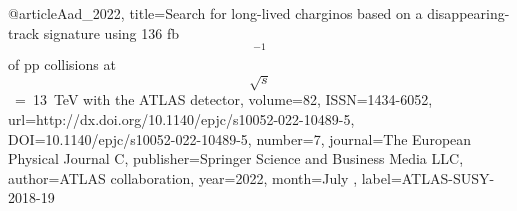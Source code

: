 @article{Aad_2022, 
    title={Search for long-lived charginos based on a disappearing-track signature using 136 fb$$^{-1}$$ of pp collisions at $$\sqrt{s}$$ = 13 TeV with the ATLAS detector}, 
    volume={82}, 
    ISSN={1434-6052}, 
    url={http://dx.doi.org/10.1140/epjc/s10052-022-10489-5}, 
    DOI={10.1140/epjc/s10052-022-10489-5}, 
    number={7}, 
    journal={The European Physical Journal C}, 
    publisher={Springer Science and Business Media LLC}, 
    author={ATLAS collaboration}, 
    year={2022}, 
    month=July ,
    label={ATLAS-SUSY-2018-19}
}

